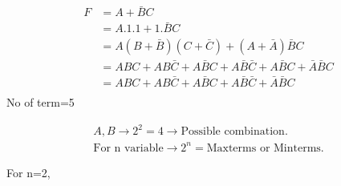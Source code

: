 \documentclass[a4aper,12pt]{report}
\newcounter{questionbox}[chapter]
\begin{document}
\vspace{10pt}
\begin{questionbox}
    \begin{align*}
        F&=A+\bar{B}C\\
        &=A.1.1+1.\bar{B}C\\
        &=A(B+\bar{B})(C+\bar{C})+(A+\bar{A})\bar{B}C\\
        &=ABC+AB\bar{C}+A\bar{B}C+A\bar{B}\bar{C}+A\bar{B}C+\bar{A}\bar{B}C\\
        &=ABC+AB\bar{C}+A\bar{B}C+A\bar{B}\bar{C}+\bar{A}\bar{B}C\\
    \end{align*}
    No of  term=5
\end{questionbox}
\vspace{10pt}

\begin{questionbox}
    \begin{align*}
        A,B \longrightarrow 2^2=4\longrightarrow \text{Possible combination}.\\
        \text{For n variable}\longrightarrow 2^n=\text{Maxterms or Minterms}.
    \end{align*}
\end{questionbox}
\vspace{10pt}
\begin{questionbox}[For \ensuremath{n=4,}what is the total number of logical expression?]
    For n=2,
    
\end{questionbox}
\end{document}
